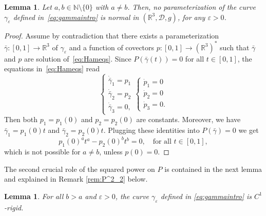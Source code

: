 \documentclass[12pt]{amsart}
\theoremstyle{plain}
\newtheorem {lemma}[theorem]{Lemma}
\theoremstyle{definition}
\theoremstyle{remark}
\numberwithin{equation}{section}
\newcommand{\R}{\mathbb{R}}
\newcommand{\N}{\mathbb{N}}
\newcommand{\D}{\mathcal{D}}
\newcommand{\<}{\langle}
\renewcommand{\>}{\rangle}
\newcommand{\e}{\varepsilon}
\newcommand{\0}{\theta}
\newcommand{\g}{\gamma}
\newcommand{\1}{{-1}}
\renewcommand{\=}{\coloneqq}
\renewcommand{\.}{\dots}
\renewcommand{\-}{\cdot}
\renewcommand{\:}{\,:\,}
\theoremstyle{definition}
\begin{document}
\begin{lemma}
	\label{lem:str_abn}
	Let $a,b\in\N\setminus\{0\}$ with $a\neq b$. Then, no parameterization of the curve $\g_\e$ defined in~\eqref{eq:gammaintro} is normal in $(\R^3,\D,g)$, for any $\e>0$.
\end{lemma}

\begin{proof}
	Assume by contradiction that there exists a parameterization $\bar\g:[0,1]\to\R^3$ of $\g_\e$ and a function of covectors $p:[0,1]\to(\R^3)^*$ such that $\bar\g$ and $p$ are solution of~\eqref{eq:Hameqs}. Since $P(\bar\g(t))=0$ for all $t\in[0,1]$, the equations in~\eqref{eq:Hameqs} read
	\begin{equation}
		\begin{cases}
			\dot {\bar\g}_1=p_1\\
			\dot {\bar\g}_2=p_2\\
			\dot {\bar\g}_3=0,
		\end{cases}
		\begin{cases}
			\dot p_1=0\\
			\dot p_2=0\\
			\dot p_3=0.
		\end{cases}
	\end{equation} 
	Then both $p_1=p_1(0)$ and $p_2=p_2(0)$ are constants. Moreover, we have $\bar\g_1=p_1(0)t$ and $\bar\g_2=p_2(0)t$. Plugging these identities into $P(\bar\g)=0$ we get
	\begin{equation}
		\label{eq:non-normal}
		p_1(0)^at^a - p_2(0)^bt^b=0, \quad \text{for all } t\in[0,1],
	\end{equation}
	which is not possible for $a\neq b$, unless $p(0)=0$.
\end{proof}





	
The second crucial role of the squared power on $P$ is contained in the next lemma and explained in Remark \ref{rem:P^2_2} below.

\begin{lemma}
	\label{lem:C1-rigid}
	For all $b>a$ and $\e>0$, the curve $\g_\e$ defined in \eqref{eq:gammaintro} is $C^1$-rigid.
\end{lemma}
\end{document}
